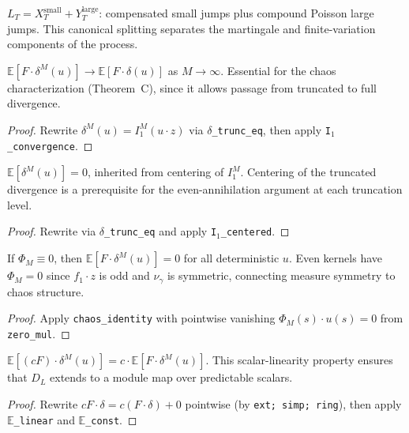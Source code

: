 \begin{defn}\label{def:levy_ito}
\leanok
{}
$L_T = X_T^{\mathrm{small}} + Y_T^{\mathrm{large}}$: compensated small jumps
plus compound Poisson large jumps.
This canonical splitting separates the martingale and finite-variation components of the process.
\end{defn}

\begin{theorem}\label{thm:trunc_conv}
\leanok
{}
$\mathbb{E}[F \cdot \delta^M(u)] \to \mathbb{E}[F \cdot \delta(u)]$ as $M \to \infty$.
Essential for the chaos characterization (Theorem~C), since it allows passage from truncated to full divergence.
\end{theorem}
\begin{proof}\leanok Rewrite $\delta^M(u) = I_1^M(u \cdot z)$ via \texttt{$\delta$\_trunc\_eq}, then apply \texttt{I$_1$\_convergence}.\end{proof}

\begin{theorem}\label{thm:delta_centered}
\leanok
{}
$\mathbb{E}[\delta^M(u)] = 0$, inherited from centering of $I_1^M$.
Centering of the truncated divergence is a prerequisite for the even-annihilation argument at each truncation level.
\end{theorem}
\begin{proof}\leanok Rewrite via \texttt{$\delta$\_trunc\_eq} and apply \texttt{I$_1$\_centered}.\end{proof}

\begin{theorem}\label{thm:chaos_orth}
\leanok
{}
If $\Phi_M \equiv 0$, then $\mathbb{E}[F \cdot \delta^M(u)] = 0$
for all deterministic $u$. Even kernels have $\Phi_M = 0$ since $f_1 \cdot z$
is odd and $\nu_\gamma$ is symmetric, connecting measure symmetry to chaos structure.
\end{theorem}
\begin{proof}\leanok Apply \texttt{chaos\_identity} with pointwise vanishing $\Phi_M(s) \cdot u(s) = 0$ from \texttt{zero\_mul}.\end{proof}

\begin{theorem}\label{thm:pred_module}
\leanok
{}
$\mathbb{E}[(cF) \cdot \delta^M(u)] = c \cdot \mathbb{E}[F \cdot \delta^M(u)]$.
This scalar-linearity property ensures that $D_L$ extends to a module map over predictable scalars.
\end{theorem}
\begin{proof}\leanok Rewrite $cF \cdot \delta = c(F \cdot \delta) + 0$ pointwise (by \texttt{ext; simp; ring}), then apply \texttt{$\mathbb{E}$\_linear} and \texttt{$\mathbb{E}$\_const}.\end{proof}

